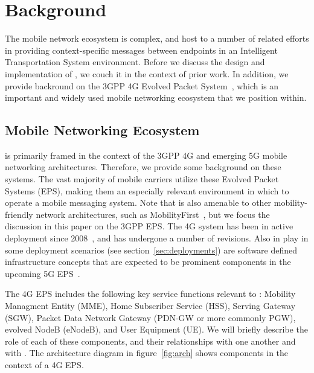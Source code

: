 \section{Background}

The mobile network ecosystem is complex, and host to a number of
related efforts in providing context-specific messages between
endpoints in an Intelligent Transportation System environment. Before
we discuss the design and implementation of \name, we couch it in
the context of prior work. In addition, we provide backround on the
3GPP 4G Evolved Packet System~\cite{4G}, which is an important and
widely used mobile networking ecosystem that we position \name
within.

%
%


\subsection{Mobile Networking Ecosystem}

\name is primarily framed in the context of the 3GPP 4G and emerging
5G mobile networking architectures. Therefore, we provide some
background on these systems.  The vast majority of mobile carriers
utilize these Evolved Packet Systems (EPS), making them an especially
relevant environment in which to operate a mobile messaging system.
Note that \name is also amenable to other mobility-friendly network
architectures, such as MobilityFirst~\cite{raychaudhuri2012mobilityfirst}, 
but we
focus the discussion in this paper on the 3GPP EPS.  The 4G system has
been in active deployment since 2008~\cite{chen2015financial}, and has
undergone a number of revisions. Also in play in some deployment
scenarios (see section~\ref{sec:deployments}) are software defined
infrastructure concepts that are expected to be prominent components
in the upcoming 5G EPS~\cite{5gvision}.

The 4G EPS includes the following key service functions relevant to
\name: Mobility Managment Entity (MME), Home Subscriber Service
(HSS), Serving Gateway (SGW), Packet Data Network Gateway (PDN-GW or
more commonly PGW), evolved NodeB (eNodeB), and User Equipment (UE).
We will briefly describe the role of each of these components, and
their relationships with one another and with \name. The \name
architecture diagram in figure~\ref{fig:arch} shows \name
components in the context of a 4G EPS.

